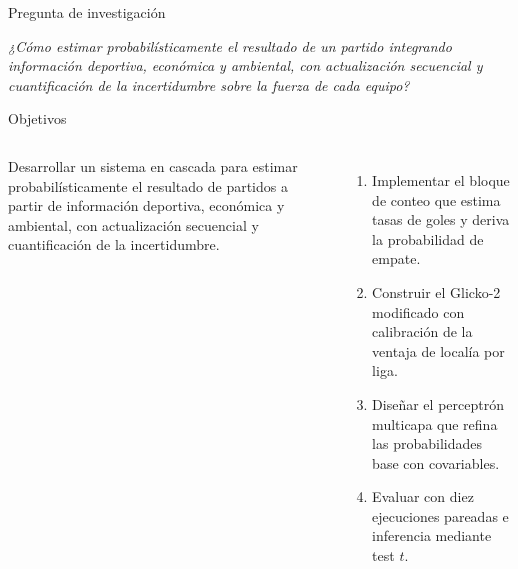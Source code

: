 \documentclass[aspectratio=169,11pt]{beamer}
\begin{document}
\begin{frame}[t]{Pregunta de investigación}
	\vfill
	\begin{alertblock}{}
		\centering
		\large
		\emph{¿C\'omo estimar probabil\'isticamente el resultado de un partido integrando informaci\'on deportiva, econ\'omica y ambiental, con actualizaci\'on secuencial y cuantificaci\'on de la incertidumbre sobre la fuerza de cada equipo?}
	\end{alertblock}
	\vfill
\end{frame}

\begin{frame}[shrink]{Objetivos}
	\footnotesize
	\begin{columns}[T,onlytextwidth]
		\par\vskip 2mm
		Desarrollar un sistema en cascada para estimar probabil\'isticamente el resultado de partidos a partir de informaci\'on deportiva, econ\'omica y ambiental, con actualizaci\'on secuencial y cuantificaci\'on de la incertidumbre.
		\par\vskip 2mm
		\begin{enumerate}
			\item Implementar el bloque de conteo que estima tasas de goles y deriva la probabilidad de empate.
			\item Construir el Glicko-2 modificado con calibraci\'on de la ventaja de local\'ia por liga.
			\item Dise\~nar el perceptr\'on multicapa que refina las probabilidades base con covariables.
			\item Evaluar con diez ejecuciones pareadas e inferencia mediante test $t$.
		\end{enumerate}
	\end{columns}
\end{frame}
\end{document}
